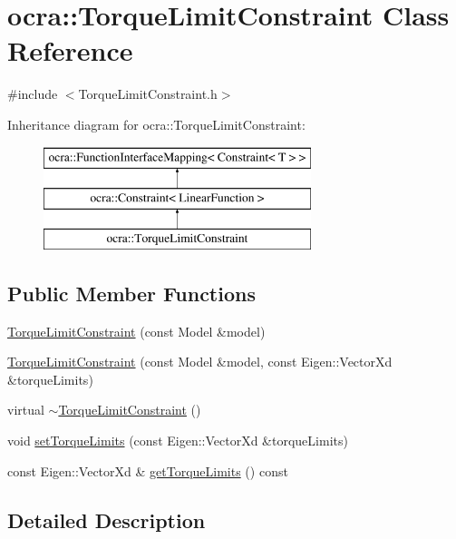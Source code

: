 \hypertarget{classocra_1_1TorqueLimitConstraint}{}\section{ocra\+:\+:Torque\+Limit\+Constraint Class Reference}
\label{classocra_1_1TorqueLimitConstraint}


{\ttfamily \#include $<$Torque\+Limit\+Constraint.\+h$>$}

Inheritance diagram for ocra\+:\+:Torque\+Limit\+Constraint\+:\begin{figure}[H]
\begin{center}
\leavevmode
\includegraphics[height=3.000000cm]{d2/da4/classocra_1_1TorqueLimitConstraint}
\end{center}
\end{figure}
\subsection*{Public Member Functions}
\begin{DoxyCompactItemize}
\item 
\hyperlink{classocra_1_1TorqueLimitConstraint_ac1d452a8e42d05489ab0b16c9abbba0b}{Torque\+Limit\+Constraint} (const Model \&model)
\item 
\hyperlink{classocra_1_1TorqueLimitConstraint_adf43adabb40dc149d609b219fe8b7ac0}{Torque\+Limit\+Constraint} (const Model \&model, const Eigen\+::\+Vector\+Xd \&torque\+Limits)
\item 
virtual \hyperlink{classocra_1_1TorqueLimitConstraint_a893e34cf1ab2a6faf59bf394e769bbe3}{$\sim$\+Torque\+Limit\+Constraint} ()
\item 
void \hyperlink{classocra_1_1TorqueLimitConstraint_aae5d3c15e07731fb19f2f55b45852554}{set\+Torque\+Limits} (const Eigen\+::\+Vector\+Xd \&torque\+Limits)
\item 
const Eigen\+::\+Vector\+Xd \& \hyperlink{classocra_1_1TorqueLimitConstraint_a34f89a0c633bf6a8cabf79f9d6d22871}{get\+Torque\+Limits} () const
\end{DoxyCompactItemize}


\subsection{Detailed Description}


